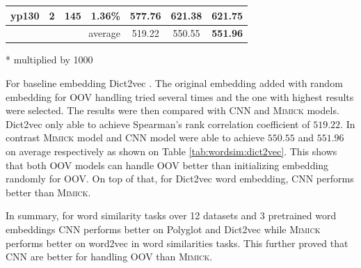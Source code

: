 \begin{table}[!ht]
\begin{threeparttable}
\begin{center}
\begin{tabular}{l|c|c|c|c|c|c}
          yp130 & 2 & 145 & 1.36\% & 577.76 & 621.38 & \textbf{621.75}\\
          \hline
          \multicolumn{4}{r|}{average} & 519.22 & 550.55 & \textbf{551.96}\\
        \end{tabular}
        \begin{tablenotes}
          \item[*] multiplied by 1000
        \end{tablenotes}
      \end{center}
    \end{threeparttable} 
    \end{table}

    For baseline embedding Dict2vec \citep{dict2vect2017tissier}. The
    original embedding added with random embedding for OOV handling
    tried several times and the one with highest results were
    selected. The results were then compared with CNN and
    \textsc{Mimick} models. Dict2vec only able to achieve Spearman's
    rank correlation coefficient of $519.22$. In contrast
    \textsc{Mimick} model and CNN model were able to achieve $550.55$
    and $551.96$ on average respectively as shown on Table
    \ref{tab:wordsim:dict2vec}. This shows that both OOV models can
    handle OOV better than initializing embedding randomly for OOV. On
    top of that, for Dict2vec word embedding, CNN performs better than
    \textsc{Mimick}.

    In summary, for word similarity tasks over 12 datasets and 3
    pretrained word embeddings CNN performs better on Polyglot and
    Dict2vec while \textsc{Mimick} performs better on word2vec in word
    similarities tasks. This further proved that CNN are better for
    handling OOV than \textsc{Mimick}.